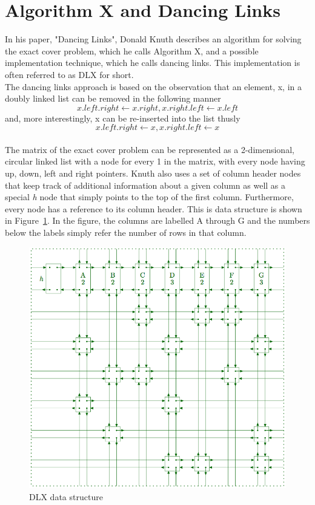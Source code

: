 \documentclass[12pt]{article}
\newcounter{row}
\newcounter{col}
\begin{document}
\section{Algorithm X and Dancing Links}
In his paper, "Dancing Links", Donald Knuth describes an algorithm for solving the exact cover problem, which he calls Algorithm X, and a possible implementation technique, which he calls dancing links. This implementation is often referred to as DLX for short. \\
The dancing links approach is based on the observation that an element, x, in a doubly linked list can be removed in the following manner
\[ x.left.right \gets x.right, x.right.left \gets x.left \]
and, more interestingly, x can be re-inserted into the list thusly
\[ x.left.right \gets x, x.right.left \gets x \]
\\
The matrix of the exact cover problem can be represented as a 2-dimensional, circular linked list with a node for every 1 in the matrix, with every node having up, down, left and right pointers. Knuth also uses a set of column header nodes that keep track of additional information about a given column as well as a special \textit{h} node that simply points to the top of the first column. Furthermore, every node has a reference to its column header. This is data structure is shown in Figure~\ref{dlx}. In the figure, the columns are labelled A through G and the numbers below the labels simply refer the number of rows in that column.
\begin{figure}[H]
\begin{center}
\includegraphics[width=0.9\columnwidth]{dancing_links}
\caption{DLX data structure}
\label{dlx}
\end{center}
\end{figure}
\end{document}
